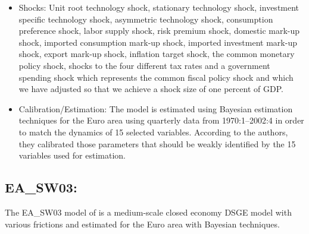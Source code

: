 \documentclass[11pt,a4paper]{article}
\begin{document}
\begin{itemize}
		\item Shocks: Unit root technology shock, stationary technology shock, investment specific technology shock, asymmetric technology shock, consumption preference shock, labor supply shock, risk premium shock, domestic mark-up shock, imported consumption mark-up shock, imported investment mark-up shock, export mark-up shock, inflation target shock, the common monetary policy shock, shocks to the four different tax rates and a government spending shock which represents the common fiscal policy shock and which we have adjusted so that we achieve a shock size of one percent of GDP.
		\item Calibration/Estimation: The model is estimated using Bayesian estimation techniques for the Euro area using quarterly data from 1970:1--2002:4 in order to match the dynamics of 15 selected variables. According to the authors, they calibrated those parameters that should be weakly identified by the 15 variables used for estimation.
		
	\end{itemize}
	
	
	
	
	
	\subsection{EA\_SW03: \cite{SmetsWouters2003}}
	\label{EASW03}
	The EA\_SW03 model of \cite{SmetsWouters2003} is a medium-scale closed economy DSGE model with various frictions and estimated for the Euro area with Bayesian techniques.
	
\end{document}
